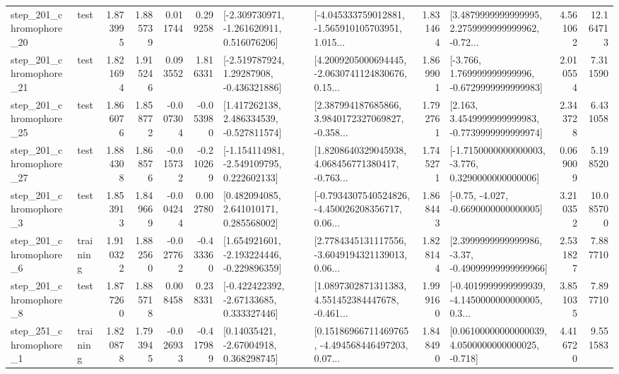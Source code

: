 \begin{tabular}{llrrrrllrlrr}
  step\_201\_chromophore\_20 &      test &      1.873995 &    1.885739 &      0.011744 &  0.299258 &   [-2.309730971, -1.261620911, 0.516076206] &  [-4.045333759012881, -1.565910105703951, 1.015... &       1.831464 &  [3.4879999999999995, 2.2759999999999962, -0.72... &            4.561062 &         12.164713 \\
  step\_201\_chromophore\_21 &      test &      1.821694 &    1.915246 &      0.093552 &  1.816331 &    [-2.519787924, 1.29287908, -0.436321886] &  [4.2009205000694445, -2.0630741124830676, 0.15... &       1.869901 &   [-3.766, 1.769999999999996, -0.6729999999999983] &            2.010554 &          7.311590 \\
  step\_201\_chromophore\_25 &      test &      1.866076 &    1.858772 &     -0.007304 & -0.053980 &    [1.417262138, 2.486334539, -0.527811574] &  [2.387994187685866, 3.9840172327069827, -0.358... &       1.792761 &   [2.163, 3.4549999999999983, -0.7739999999999974] &            2.343728 &          6.431058 \\
  step\_201\_chromophore\_27 &      test &      1.884308 &    1.868576 &     -0.015732 & -0.210269 &   [-1.154114981, -2.549109795, 0.222602133] &  [1.8208640329045938, 4.068456771380417, -0.763... &       1.745271 &  [-1.7150000000000003, -3.776, 0.3290000000000006] &            0.069009 &          5.198520 \\
   step\_201\_chromophore\_3 &      test &      1.853913 &    1.849669 &     -0.004244 &  0.002780 &     [0.482094085, 2.641010171, 0.285568002] &  [-0.7934307540524826, -4.450026208356717, 0.06... &       1.868443 &               [-0.75, -4.027, -0.6690000000000005] &            3.210352 &         10.085700 \\
   step\_201\_chromophore\_6 &  training &      1.910322 &    1.882560 &     -0.027762 & -0.433360 &   [1.654921601, -2.193224446, -0.229896359] &  [2.7784345131117556, -3.6049194321139013, 0.06... &       1.828144 &  [2.3999999999999986, -3.37, -0.49099999999999966] &            2.531827 &          7.887710 \\
   step\_201\_chromophore\_8 &      test &      1.877260 &    1.885718 &      0.008458 &  0.238331 &    [-0.422422392, -2.67133685, 0.333327446] &  [1.0897302871311383, 4.551452384447678, -0.461... &       1.999160 &  [-0.4019999999999939, -4.1450000000000005, 0.3... &            3.851035 &          7.897710 \\
   step\_251\_chromophore\_1 &  training &      1.820878 &    1.793945 &     -0.026933 & -0.417989 &      [0.14035421, -2.67004918, 0.368298745] &  [0.15186966711469765, -4.494568446497203, 0.07... &       1.848490 &  [0.06100000000000039, 4.0500000000000025, -0.718] &            4.416720 &          9.551583 \\

\end{tabular}
